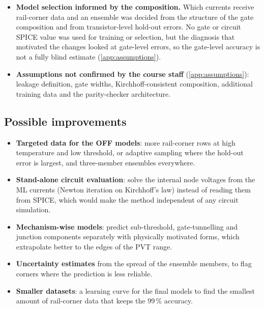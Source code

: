 \begin{itemize}
  \item \textbf{Model selection informed by the composition.} Which currents receive rail-corner data and an ensemble was decided from the structure of
        the gate composition and from transistor-level hold-out errors. No gate or circuit SPICE value was used for training or selection, but the
        diagnosis that motivated the changes looked at gate-level errors, so the gate-level accuracy is not a fully blind estimate (\cref{app:assumptions}).
  \item \textbf{Assumptions not confirmed by the course staff} (\cref{app:assumptions}): leakage definition, gate widths, Kirchhoff-consistent
        composition, additional training data and the parity-checker architecture.
\end{itemize}

\subsection{Possible improvements}
\begin{itemize}
  \item \textbf{Targeted data for the OFF models}: more rail-corner rows at high temperature and low threshold, or adaptive sampling where the
        hold-out error is largest, and three-member ensembles everywhere.
  \item \textbf{Stand-alone circuit evaluation}: solve the internal node voltages from the ML currents (Newton iteration on Kirchhoff's law) instead
        of reading them from SPICE, which would make the method independent of any circuit simulation.
  \item \textbf{Mechanism-wise models}: predict sub-threshold, gate-tunnelling and junction components separately with physically motivated forms,
        which extrapolate better to the edges of the PVT range.
  \item \textbf{Uncertainty estimates} from the spread of the ensemble members, to flag corners where the prediction is less reliable.
  \item \textbf{Smaller datasets}: a learning curve for the final models to find the smallest amount of rail-corner data that keeps the 99\,\% accuracy.
\end{itemize}
